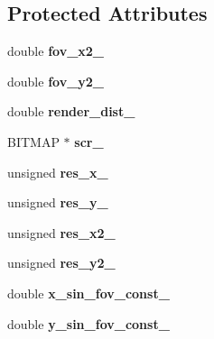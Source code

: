 \subsection*{Protected Attributes}
\begin{DoxyCompactItemize}
\item 
double {\bfseries fov\+\_\+x2\+\_\+}\hypertarget{class_camera_ad6f9e802013ee6a2b213b9d10c98486d}{}\label{class_camera_ad6f9e802013ee6a2b213b9d10c98486d}

\item 
double {\bfseries fov\+\_\+y2\+\_\+}\hypertarget{class_camera_ad7cca2cccd8e80f609b4286b80790a32}{}\label{class_camera_ad7cca2cccd8e80f609b4286b80790a32}

\item 
double {\bfseries render\+\_\+dist\+\_\+}\hypertarget{class_camera_afa21bbf24f05d8de6f627c69c9483f51}{}\label{class_camera_afa21bbf24f05d8de6f627c69c9483f51}

\item 
B\+I\+T\+M\+AP $\ast$ {\bfseries scr\+\_\+}\hypertarget{class_camera_a894521c08c09d8aceafadb9e936f6078}{}\label{class_camera_a894521c08c09d8aceafadb9e936f6078}

\item 
unsigned {\bfseries res\+\_\+x\+\_\+}\hypertarget{class_camera_a2802feb57ae1946b07bbdba556fcbeb7}{}\label{class_camera_a2802feb57ae1946b07bbdba556fcbeb7}

\item 
unsigned {\bfseries res\+\_\+y\+\_\+}\hypertarget{class_camera_a03472c7407e3cc29e7c4b5917bfcd6ee}{}\label{class_camera_a03472c7407e3cc29e7c4b5917bfcd6ee}

\item 
unsigned {\bfseries res\+\_\+x2\+\_\+}\hypertarget{class_camera_a42e9c3892b3afc9a24001a3c537da592}{}\label{class_camera_a42e9c3892b3afc9a24001a3c537da592}

\item 
unsigned {\bfseries res\+\_\+y2\+\_\+}\hypertarget{class_camera_a0a7acab770bd82600f504cd0325b3b00}{}\label{class_camera_a0a7acab770bd82600f504cd0325b3b00}

\item 
double {\bfseries x\+\_\+sin\+\_\+fov\+\_\+const\+\_\+}\hypertarget{class_camera_a7ffda0b88dafdbd3156d59bbec896bd0}{}\label{class_camera_a7ffda0b88dafdbd3156d59bbec896bd0}

\item 
double {\bfseries y\+\_\+sin\+\_\+fov\+\_\+const\+\_\+}\hypertarget{class_camera_a6489f19c9ae8cb252513bee7c76ea922}{}\label{class_camera_a6489f19c9ae8cb252513bee7c76ea922}


\end{DoxyCompactItemize}
